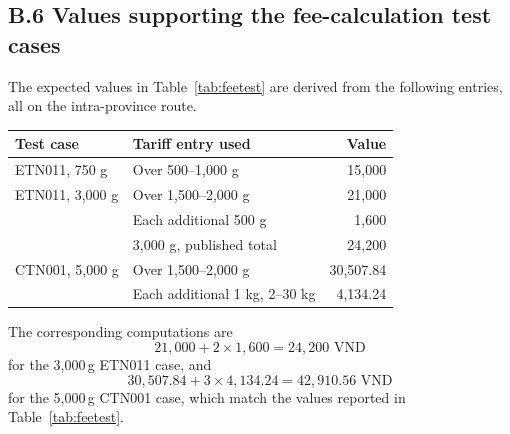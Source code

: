 \subsection*{B.6 Values supporting the fee-calculation test cases}

\noindent The expected values in Table~\ref{tab:feetest} are derived from the following entries, all on the intra-province route.

\begin{table}[H]
\centering
\small
\begin{tabular}{llr}
\hline
\textbf{Test case} & \textbf{Tariff entry used} & \textbf{Value} \\
\hline
ETN011, 750 g & Over 500--1,000 g & 15,000 \\
\hline
ETN011, 3,000 g & Over 1,500--2,000 g & 21,000 \\
 & Each additional 500 g & 1,600 \\
 & 3,000 g, published total & 24,200 \\
\hline
CTN001, 5,000 g & Over 1,500--2,000 g & 30,507.84 \\
 & Each additional 1 kg, 2--30 kg & 4,134.24 \\
\hline
\end{tabular}
\end{table}

\noindent The corresponding computations are
\[ 21{,}000 + 2 \times 1{,}600 = 24{,}200 \text{ VND} \]
for the 3,000\,g ETN011 case, and
\[ 30{,}507.84 + 3 \times 4{,}134.24 = 42{,}910.56 \text{ VND} \]
for the 5,000\,g CTN001 case, which match the values reported in Table~\ref{tab:feetest}.
